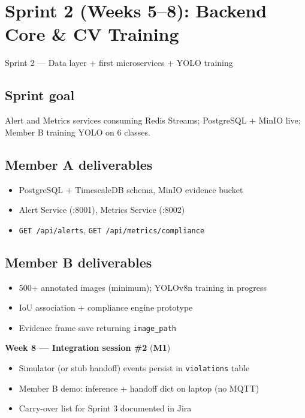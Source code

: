 \documentclass[12pt,a4paper]{article}
\begin{document}
\section{Sprint 2 (Weeks 5--8): Backend Core \& CV Training}

\begin{sprintbox}{Sprint 2 --- Data layer + first microservices + YOLO training}

\subsection*{Sprint goal}
Alert and Metrics services consuming Redis Streams; PostgreSQL + MinIO live; Member B training YOLO on 6 classes.

\subsection*{Member A deliverables}
\begin{itemize}
    \item PostgreSQL + TimescaleDB schema, MinIO evidence bucket
    \item Alert Service (:8001), Metrics Service (:8002)
    \item \texttt{GET /api/alerts}, \texttt{GET /api/metrics/compliance}
\end{itemize}

\subsection*{Member B deliverables}
\begin{itemize}
    \item 500+ annotated images (minimum); YOLOv8n training in progress
    \item IoU association + compliance engine prototype
    \item Evidence frame save returning \texttt{image\_path}
\end{itemize}

\begin{collabbox}
\textbf{Week 8 --- Integration session \#2} (\textbf{M1})
\begin{itemize}
    \item Simulator (or stub handoff) events persist in \texttt{violations} table
    \item Member B demo: inference + handoff dict on laptop (no MQTT)
    \item Carry-over list for Sprint 3 documented in Jira
\end{itemize}
\end{collabbox}

\end{sprintbox}
\end{document}
